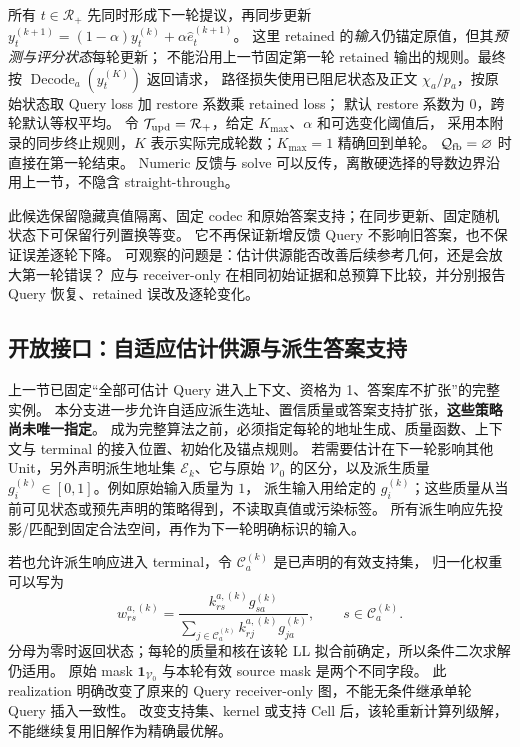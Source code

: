 \documentclass[11pt,UTF8,fontset=fandol]{ctexart}
\numberwithin{equation}{section}
\theoremstyle{definition}
\newcommand{\Vset}{\mathcal V}
\begin{document}
所有 $t\in\mathcal R_+$ 先同时形成下一轮提议，再同步更新
$y_t^{(k+1)}=(1-\alpha)y_t^{(k)}+\alpha\widehat e_t^{(k+1)}$。
这里 retained 的\emph{输入}仍锚定原值，但其\emph{预测与评分状态}每轮更新；
不能沿用上一节固定第一轮 retained 输出的规则。最终按 $\operatorname{Decode}_a(y_t^{(K)})$ 返回请求，
路径损失使用已阻尼状态及正文 $\chi_a/p_a$，按原始状态取 Query loss 加 restore 系数乘 retained loss；
默认 restore 系数为 0，跨轮默认等权平均。
令 $\mathcal T_{\rm upd}=\mathcal R_+$，给定 $K_{\max}$、$\alpha$ 和可选变化阈值后，
采用本附录的同步终止规则，$K$ 表示实际完成轮数；$K_{\max}=1$ 精确回到单轮。
$\mathcal Q_{\rm fb}=\varnothing$ 时直接在第一轮结束。
Numeric 反馈与 solve 可以反传，离散硬选择的导数边界沿用上一节，不隐含 straight-through。

此候选保留隐藏真值隔离、固定 codec 和原始答案支持；在同步更新、固定随机状态下可保留行列置换等变。
它不再保证新增反馈 Query 不影响旧答案，也不保证误差逐轮下降。
可观察的问题是：估计供源能否改善后续参考几何，还是会放大第一轮错误？
应与 receiver-only 在相同初始证据和总预算下比较，并分别报告 Query 恢复、retained 误改及逐轮变化。

\subsection{开放接口：自适应估计供源与派生答案支持}
\label{v52:subsec:derived-feedback}
上一节已固定“全部可估计 Query 进入上下文、资格为 1、答案库不扩张”的完整实例。
本分支进一步允许自适应派生选址、置信质量或答案支持扩张，\textbf{这些策略尚未唯一指定}。
成为完整算法之前，必须指定每轮的地址生成、质量函数、上下文与 terminal 的接入位置、初始化及锚点规则。
若需要估计在下一轮影响其他 Unit，另外声明派生地址集 $\mathcal E_k$、它与原始
$\Vset_0$ 的区分，以及派生质量 $g_i^{(k)}\in[0,1]$。例如原始输入质量为 $1$，
派生输入用给定的 $g_i^{(k)}$；这些质量从当前可见状态或预先声明的策略得到，不读取真值或污染标签。
所有派生响应先投影/匹配到固定合法空间，再作为下一轮明确标识的输入。

若也允许派生响应进入 terminal，令 $\mathcal C_a^{(k)}$ 是已声明的有效支持集，
归一化权重可以写为
\begin{equation}
 w_{rs}^{a,(k)}
 =\frac{k_{rs}^{a,(k)}g_{sa}^{(k)}}
 {\sum_{j\in\mathcal C_a^{(k)}}k_{rj}^{a,(k)}g_{ja}^{(k)}},
 \qquad s\in\mathcal C_a^{(k)}.
 \label{v52:eq:derived-support-weight}
\end{equation}
分母为零时返回状态；每轮的质量和核在该轮 LL 拟合前确定，所以条件二次求解仍适用。
原始 mask $\mathbf1_{\Vset_0}$ 与本轮有效 source mask 是两个不同字段。
此 realization 明确改变了原来的 Query receiver-only 图，不能无条件继承单轮 Query 插入一致性。
改变支持集、kernel 或支持 Cell 后，该轮重新计算列级解，不能继续复用旧解作为精确最优解。
\end{document}
